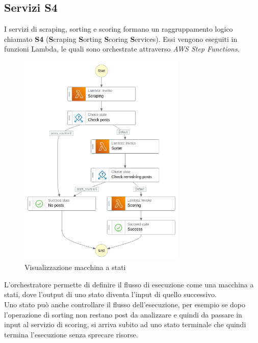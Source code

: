 \subsection{Servizi S4}
I servizi di scraping, sorting e scoring formano un raggruppamento logico chiamato \textbf{S4} (\textbf{S}craping \textbf{S}orting \textbf{S}coring \textbf{S}ervices).
Essi vengono eseguiti in funzioni Lambda, le quali sono orchestrate attraverso \textit{AWS Step Functions}.
\begin{figure}[H]
    \includegraphics[width=8cm]{sezioni/images/stepfunctions_graph.png}
    \centering
    \caption{Visualizzazione macchina a stati}
\end{figure}
L'orchestratore permette di definire il flusso di esecuzione come una macchina a stati, dove l'output di uno stato
diventa l'input di quello successivo.\\
Uno stato può anche controllare il flusso dell'esecuzione, per esempio se dopo
l'operazione di sorting non restano post da analizzare e quindi da passare in input al servizio di scoring, si arriva
subito ad uno stato terminale che quindi termina l'esecuzione senza sprecare risorse.

